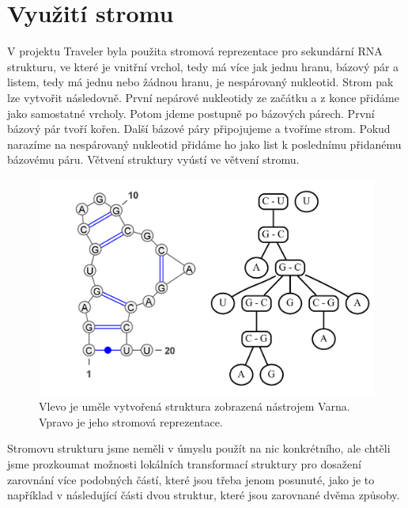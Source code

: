 \section{Využití stromu}

V projektu Traveler byla použita stromová reprezentace pro sekundární RNA
strukturu, ve které je vnitřní vrchol, tedy má více jak jednu hranu, bázový pár
a listem, tedy má jednu nebo žádnou hranu, je nespárovaný nukleotid. Strom pak
lze vytvořit následovně. První nepárové nukleotidy ze začátku a z konce přidáme
jako samostatné vrcholy. Potom jdeme postupně po bázových párech. První bázový
pár tvoří kořen. Další bázové páry připojujeme a tvoříme strom. Pokud narazíme
na nespárovaný nukleotid přidáme ho jako list k poslednímu přidanému bázovému
páru. Větvení struktury vyústí ve větvení stromu. 

\begin{figure}[H]
  \centering
  \includegraphics[width=140mm]{../img/kap02/tree/tree.png}
  \caption{Vlevo je uměle vytvořená struktura zobrazená nástrojem Varna. Vpravo je jeho stromová reprezentace.}
\end{figure}

Stromovu strukturu jsme neměli v úmyslu použít na nic konkrétního, ale chtěli
jsme prozkoumat možnosti lokálních transformací struktury pro dosažení
zarovnání více podobných částí, které jsou třeba jenom posunuté, jako je to
například v následující části dvou struktur, které jsou zarovnané dvěma
způsoby.

